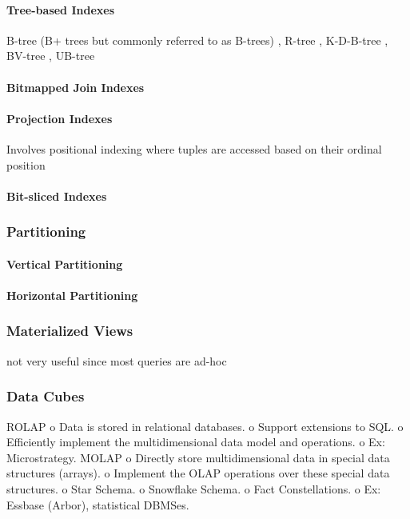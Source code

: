 \documentclass[12pt,a4paper]{article}
\begin{document}
\paragraph{Tree-based Indexes}
B-tree (B+ trees but commonly referred to as B-trees) \cite{253268}, R-tree \cite{602266, Cheung20011}, K-D-B-tree \cite{582321}, BV-tree \cite{223796}, UB-tree
\cite{bayer1997universal}


\paragraph{Bitmapped Join Indexes}
\cite{212001}


\paragraph{Projection Indexes}
Involves positional indexing where tuples are accessed based on their ordinal position \cite{628286}

\paragraph{Bit-sliced Indexes}


\subsubsection{Partitioning}
\cite{thusoo2010data}
\paragraph{Vertical Partitioning}

\paragraph{Horizontal Partitioning}

\subsubsection{Materialized Views}
not very useful since most queries are ad-hoc \cite{653447}
\cite{355309}

\subsubsection{Data Cubes}
\cite{Cheung20011}
ROLAP
          o Data is stored in relational databases.
          o Support extensions to SQL.
          o Efficiently implement the multidimensional data model and operations.
          o Ex: Microstrategy.
MOLAP
          o Directly store multidimensional data in special data structures (arrays).
          o Implement the OLAP operations over these special data structures.
          o Star Schema.
          o Snowflake Schema. \cite{kimball2009data}
          o Fact Constellations.
          o Ex: Essbase (Arbor), statistical DBMSes.
\end{document}
